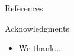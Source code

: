 \documentclass[final,hyperref={pdfpagelabels=false}]{beamer}
\begin{document}
\begin{frame}[t]
\begin{columns}[t]
\begin{column}{.23\textwidth}
\begin{block}{References}
\end{block}


\begin{block}{Acknowledgments}
\begin{itemize}
\small 
\item We thank...
\end{itemize}
\end{block}






\end{column} %


\end{columns} %

\end{frame} %
\end{document}
